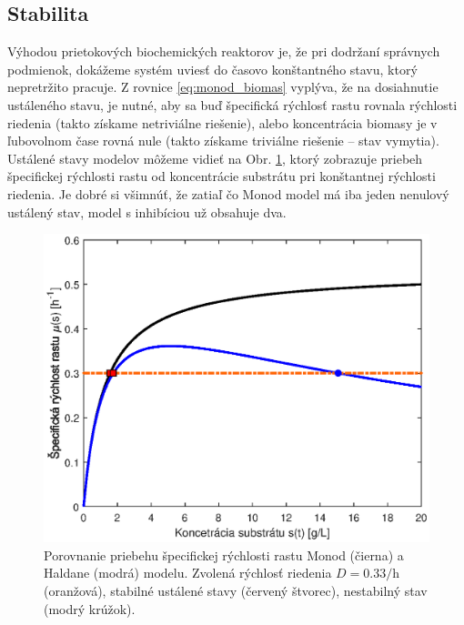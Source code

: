 \newpage
\subsection{Stabilita}
Výhodou prietokových biochemických reaktorov je, že pri dodržaní správnych podmienok, dokážeme systém uviesť do časovo konštantného stavu, ktorý nepretržito pracuje.  Z rovnice \eqref{eq:monod_biomas} vyplýva, že na dosiahnutie ustáleného stavu, je nutné, aby sa buď špecifická rýchlosť rastu rovnala rýchlosti riedenia (takto získame netriviálne riešenie), alebo koncentrácia biomasy je v ľubovolnom čase rovná nule (takto získame triviálne riešenie -- stav vymytia). Ustálené stavy modelov môžeme vidieť na Obr. \ref{fig:spec_rychl_rastu}, ktorý zobrazuje priebeh špecifickej rýchlosti rastu od koncentrácie substrátu pri konštantnej rýchlosti riedenia. Je dobré si všimnúť, že zatiaľ čo Monod model má iba jeden nenulový ustálený stav, model s inhibíciou už obsahuje dva.

\begin{figure}
	\centering
	\includegraphics[width=0.7\linewidth]{images/spec_growth_rate}
	\caption{Porovnanie priebehu špecifickej rýchlosti rastu Monod (čierna) a Haldane (modrá) modelu. Zvolená rýchlosť riedenia $ D = 0.33\si{\per\hour} $ (oranžová), stabilné ustálené stavy (červený štvorec), nestabilný stav (modrý krúžok).}
	\label{fig:spec_rychl_rastu}
\end{figure}

